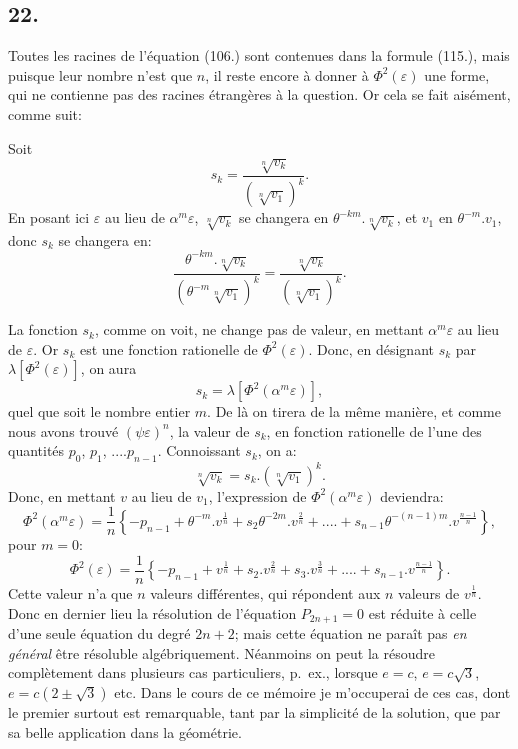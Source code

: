 \documentclass{article}
\begin{document}

\subsection*{22.}

Toutes les racines de l'équation (106.) sont contenues dans la formule (115.), mais puisque leur nombre n'est que $n$, il reste encore à donner à $\Phi^{2}(\varepsilon)$ une forme, qui ne contienne pas des racines étrangères à la question. Or cela se fait aisément, comme suit:

Soit
\[ s_{k}=\frac{\sqrt[n]{v_{k}}}{(\sqrt[n]{v_{1}})^{k}}. \]
En posant ici $\varepsilon$ au lieu de $\alpha^{m}\varepsilon$, $\sqrt[n]{v_{k}}$ se changera en $\theta^{-km}.\sqrt[n]{v_{k}}$, et $v_{1}$ en $\theta^{-m}.v_{1}$, donc $s_{k}$ se changera en:
\[ \frac{\theta^{-km}.\sqrt[n]{v_{k}}}{(\theta^{-m}\sqrt[n]{v_{1}})^{k}}=\frac{\sqrt[n]{v_{k}}}{(\sqrt[n]{v_{1}})^{k}}. \]

La fonction $s_{k}$, comme on voit, ne change pas de valeur, en mettant $\alpha^{m}\varepsilon$ au lieu de $\varepsilon$. Or $s_{k}$ est une fonction rationelle de $\Phi^{2}(\varepsilon)$. Donc, en désignant $s_{k}$ par $\lambda[\Phi^{2}(\varepsilon)]$, on aura
\[ s_{k}=\lambda[\Phi^{2}(\alpha^{m}\varepsilon)], \]
quel que soit le nombre entier $m$. De là on tirera de la même manière, et comme nous avons trouvé $(\psi\varepsilon)^{n}$, la valeur de $s_{k}$, en fonction rationelle de l'une des quantités $p_{0}$, $p_{1}$, $....p_{n-1}$. Connoissant $s_{k}$, on a:
\[ \sqrt[n]{v_{k}}=s_{k}.(\sqrt[n]{v_{1}})^{k}. \]
Donc, en mettant $v$ au lieu de $v_{1}$, l'expression de $\Phi^{2}(\alpha^{m}\varepsilon)$ deviendra:
\[ \Phi^{2}(\alpha^{m}\varepsilon)=\frac{1}{n}\left\{-p_{n-1}+\theta^{-m}.v^{\frac{1}{n}}+s_{2}\theta^{-2m}.v^{\frac{2}{n}}+....+s_{n-1}\theta^{-(n-1)m}.v^{\frac{n-1}{n}}\right\}, \tag{116.} \]
pour $m=0$:
\[ \Phi^{2}(\varepsilon)=\frac{1}{n}\left\{-p_{n-1}+v^{\frac{1}{n}}+s_{2}.v^{\frac{2}{n}}+s_{3}.v^{\frac{3}{n}}+....+s_{n-1}.v^{\frac{n-1}{n}}\right\}. \tag{117.} \]
Cette valeur n'a que $n$ valeurs différentes, qui répondent aux $n$ valeurs de $v^{\frac{1}{n}}$. Donc en dernier lieu la résolution de l'équation $P_{2n+1}=0$ est réduite à celle d'une seule équation du degré $2n+2$; mais cette équation ne paraît pas \emph{en général} être résoluble algébriquement. Néanmoins on peut la résoudre complètement dans plusieurs cas particuliers, p.\ ex., lorsque $e=c$, $e=c\sqrt{3}$, $e=c(2\pm\sqrt{3})$ etc. Dans le cours de ce mémoire je m'occuperai de ces cas, dont le premier surtout est remarquable, tant par la simplicité de la solution, que par sa belle application dans la géométrie.
\end{document}

